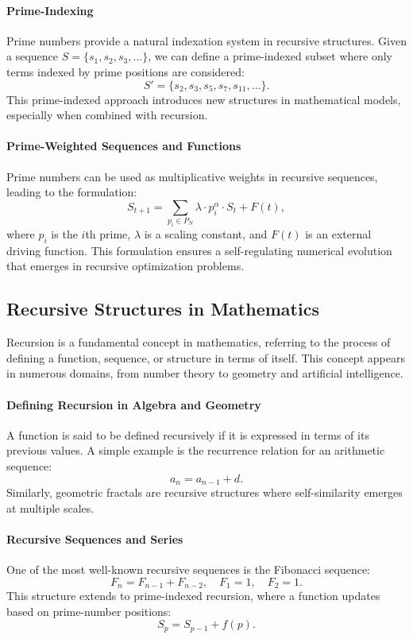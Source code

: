 \documentclass[12pt]{article}
\begin{document}
\paragraph{Prime-Indexing}
Prime numbers provide a natural indexation system in recursive structures. Given a sequence \( S = \{s_1, s_2, s_3, \dots\} \), we can define a prime-indexed subset where only terms indexed by prime positions are considered:
\[
S' = \{ s_2, s_3, s_5, s_7, s_{11}, \dots \}.
\]
This prime-indexed approach introduces new structures in mathematical models, especially when combined with recursion.

\paragraph{Prime-Weighted Sequences and Functions}
Prime numbers can be used as multiplicative weights in recursive sequences, leading to the formulation:
\[
S_{t+1} = \sum_{p_i \in P_N} \lambda \cdot p_i^\alpha \cdot S_t + F(t),
\]
where \( p_i \) is the \( i \)th prime, \( \lambda \) is a scaling constant, and \( F(t) \) is an external driving function. This formulation ensures a self-regulating numerical evolution that emerges in recursive optimization problems.

\subsection{Recursive Structures in Mathematics}

Recursion is a fundamental concept in mathematics, referring to the process of defining a function, sequence, or structure in terms of itself. This concept appears in numerous domains, from number theory to geometry and artificial intelligence.

\paragraph{Defining Recursion in Algebra and Geometry}
A function is said to be defined recursively if it is expressed in terms of its previous values. A simple example is the recurrence relation for an arithmetic sequence:
\[
a_n = a_{n-1} + d.
\]
Similarly, geometric fractals are recursive structures where self-similarity emerges at multiple scales.

\paragraph{Recursive Sequences and Series}
One of the most well-known recursive sequences is the Fibonacci sequence:
\[
F_n = F_{n-1} + F_{n-2}, \quad F_1 = 1, \quad F_2 = 1.
\]
This structure extends to prime-indexed recursion, where a function updates based on prime-number positions:
\[
S_p = S_{p-1} + f(p).
\]
\end{document}
